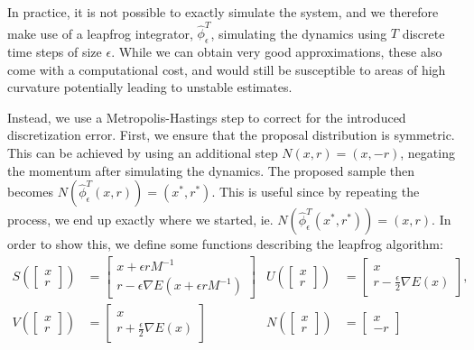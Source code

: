 In practice, it is not possible to exactly simulate the system, and we therefore make use of a leapfrog integrator, $\hat{\phi}_\epsilon^T$, simulating the dynamics using $T$ discrete time steps of size $\epsilon$.
While we can obtain very good approximations, these also come with a computational cost, and would still be susceptible to areas of high curvature potentially leading to unstable estimates. 

Instead, we use a Metropolis-Hastings step to correct for the introduced discretization error.
First, we ensure that the proposal distribution is symmetric.
This can be achieved by using an additional step $N(x, r) = (x, -r)$, negating the momentum after simulating the dynamics.
The proposed sample then becomes $ N(\hat{\phi}_\epsilon^T(x, r))= (x^\ast, r^\ast)$.
This is useful since by repeating the process, we end up exactly where we started, ie. $N(\hat{\phi}_\epsilon^T(x^\ast, r^\ast)) = (x, r)$.
In order to show this, we define some functions describing the leapfrog algorithm:
\begin{align*}
    S \left(\begin{bmatrix} x \\ r \end{bmatrix}\right) 
    &= \begin{bmatrix} x + \epsilon r M^{-1} \\ r - \epsilon \nabla E(x + \epsilon r M^{-1}) \end{bmatrix} &
    U\left(\begin{bmatrix} x \\ r \end{bmatrix}\right) 
    &= \begin{bmatrix} x \\ r - \frac{\epsilon}{2} \nabla E(x) \end{bmatrix}, \\
    V\left(\begin{bmatrix} x \\ r \end{bmatrix}\right) 
    &= \begin{bmatrix} x \\ r + \frac{\epsilon}{2} \nabla E(x) \end{bmatrix} &
    N \left(\begin{bmatrix} x \\ r \end{bmatrix}\right) 
    &= \begin{bmatrix} x \\ -r
    \end{bmatrix} 
\end{align*}
